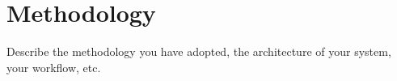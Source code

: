 \section{Methodology}
\label{sec:methodology}

Describe the methodology you have adopted, the architecture of your system, your workflow, etc.